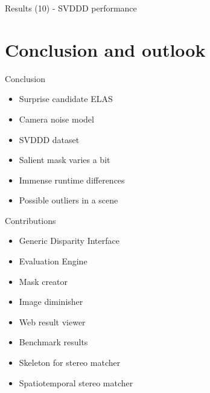 \documentclass[10pt]{beamer}
\begin{document}
\begin{frame}[fragile]{Results (10) - SVDDD performance}
  \begin{table}
  \centering
  \caption{Result table for general performance of SVDDD (PBMP$_{noc,1px}$)}
  \end{table}
\end{frame}

\section{Conclusion and outlook}

\begin{frame}[fragile]{Conclusion}
  \begin{itemize}
    \item Surprise candidate ELAS
    \item Camera noise model
    \item SVDDD dataset
    \item Salient mask varies a bit
    \item Immense runtime differences
    \item Possible outliers in a scene
  \end{itemize}
\end{frame}

\begin{frame}[fragile]{Contributions}
  \begin{itemize}
    \item Generic Disparity Interface
    \item Evaluation Engine
    \item Mask creator
    \item Image diminisher
    \item Web result viewer
    \item Benchmark results
    \item Skeleton for stereo matcher
    \item Spatiotemporal stereo matcher
  \end{itemize}
\end{frame}
\end{document}
